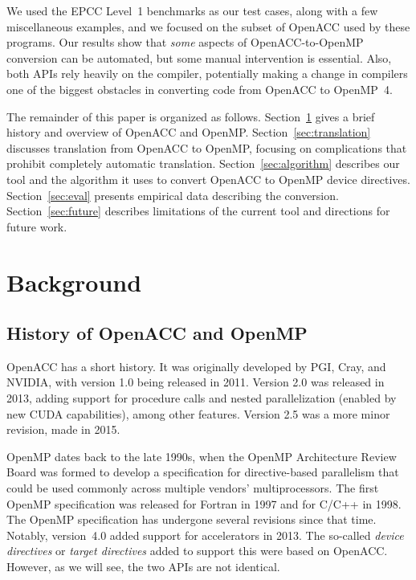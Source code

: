\documentclass{sig-alternate-05-2015}
\begin{document}
We used the EPCC Level~1 benchmarks as our test cases, along with a few
miscellaneous examples, and we focused on the subset of OpenACC used by these
programs.  Our results show that \emph{some} aspects of OpenACC-to-OpenMP
conversion can be automated, but some manual intervention is essential.
Also, both APIs rely heavily on the compiler, potentially making a change in
compilers one of the biggest obstacles in converting code from OpenACC to
OpenMP~4.

The remainder of this paper is organized as follows.
Section~\ref{sec:bg} gives a brief history and overview of OpenACC and OpenMP\@.
Section~\ref{sec:translation} discusses translation from OpenACC to OpenMP,
focusing on complications that prohibit completely automatic translation.
Section~\ref{sec:algorithm} describes our tool and the algorithm it uses to
convert OpenACC to OpenMP device directives.
Section~\ref{sec:eval} presents empirical data describing the conversion.
Section~\ref{sec:future} describes limitations of the current tool and
directions for future work.

\section{Background}
\label{sec:bg}

\subsection{History of OpenACC and OpenMP}

OpenACC has a short history. It was originally developed by PGI, Cray, and
NVIDIA, with version 1.0 being released in 2011. Version 2.0 was released in
2013, adding support for procedure calls and nested parallelization (enabled by
new CUDA capabilities), among other features. Version 2.5 was a more minor
revision, made in 2015.

OpenMP dates back to the late 1990s, when the OpenMP Architecture Review Board
was formed to develop a specification for directive-based parallelism that
could be used commonly across multiple vendors' multiprocessors. The first
OpenMP specification was released for Fortran in 1997 and for C/C++ in 1998.
The OpenMP specification has undergone several revisions since that time.
Notably, %
version~4.0 added support for accelerators in 2013.  The so-called
\emph{device directives} or \emph{target directives} added to support this
were based on OpenACC.  However, as we will see, the two APIs are not
identical.
\end{document}

